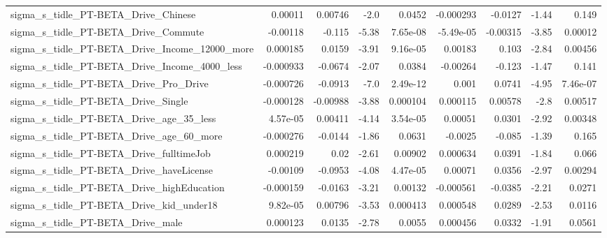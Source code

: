 \begin{tabular}{lrrrrrrrr}
sigma\_s\_tidle\_PT-BETA\_Drive\_Chinese                &     0.00011 &      0.00746 &      -2.0 &   0.0452 &  -0.000293 &     -0.0127 &        -1.44 &         0.149 \\
sigma\_s\_tidle\_PT-BETA\_Drive\_Commute                &    -0.00118 &       -0.115 &     -5.38 & 7.65e-08 &  -5.49e-05 &    -0.00315 &        -3.85 &       0.00012 \\
sigma\_s\_tidle\_PT-BETA\_Drive\_Income\_12000\_more      &    0.000185 &       0.0159 &     -3.91 & 9.16e-05 &    0.00183 &       0.103 &        -2.84 &       0.00456 \\
sigma\_s\_tidle\_PT-BETA\_Drive\_Income\_4000\_less       &   -0.000933 &      -0.0674 &     -2.07 &   0.0384 &   -0.00264 &      -0.123 &        -1.47 &         0.141 \\
sigma\_s\_tidle\_PT-BETA\_Drive\_Pro\_Drive              &   -0.000726 &      -0.0913 &      -7.0 & 2.49e-12 &      0.001 &      0.0741 &        -4.95 &      7.46e-07 \\
sigma\_s\_tidle\_PT-BETA\_Drive\_Single                 &   -0.000128 &     -0.00988 &     -3.88 & 0.000104 &   0.000115 &     0.00578 &         -2.8 &       0.00517 \\
sigma\_s\_tidle\_PT-BETA\_Drive\_age\_35\_less            &    4.57e-05 &      0.00411 &     -4.14 & 3.54e-05 &    0.00051 &      0.0301 &        -2.92 &       0.00348 \\
sigma\_s\_tidle\_PT-BETA\_Drive\_age\_60\_more            &   -0.000276 &      -0.0144 &     -1.86 &   0.0631 &    -0.0025 &      -0.085 &        -1.39 &         0.165 \\
sigma\_s\_tidle\_PT-BETA\_Drive\_fulltimeJob            &    0.000219 &         0.02 &     -2.61 &  0.00902 &   0.000634 &      0.0391 &        -1.84 &         0.066 \\
sigma\_s\_tidle\_PT-BETA\_Drive\_haveLicense            &    -0.00109 &      -0.0953 &     -4.08 & 4.47e-05 &    0.00071 &      0.0356 &        -2.97 &       0.00294 \\
sigma\_s\_tidle\_PT-BETA\_Drive\_highEducation          &   -0.000159 &      -0.0163 &     -3.21 &  0.00132 &  -0.000561 &     -0.0385 &        -2.21 &        0.0271 \\
sigma\_s\_tidle\_PT-BETA\_Drive\_kid\_under18            &    9.82e-05 &      0.00796 &     -3.53 & 0.000413 &   0.000548 &      0.0289 &        -2.53 &        0.0116 \\
sigma\_s\_tidle\_PT-BETA\_Drive\_male                   &    0.000123 &       0.0135 &     -2.78 &   0.0055 &   0.000456 &      0.0332 &        -1.91 &        0.0561 \\

\end{tabular}
